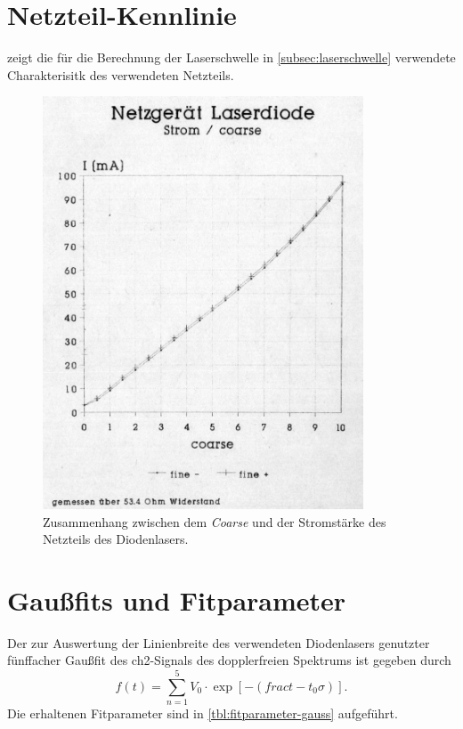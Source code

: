 \documentclass[../bericht.tex]{subfiles}
\begin{document}
  \begin{appendices}

    \section{Netzteil-Kennlinie}
    \label{sec:netzteil-kennlinie}
       zeigt die für die Berechnung der Laserschwelle in \cref{subsec:laserschwelle} verwendete Charakterisitk des verwendeten Netzteils.

      \begin{figure}[H]
        \centering
        \includegraphics[width=0.85\textwidth]{figures/Stromkennlinie_Laserdiode.pdf}
        \caption{Zusammenhang zwischen dem \textit{Coarse} und der Stromstärke des Netzteils des Diodenlasers.}
        \label{fig:netzteil-kennlinie}
      \end{figure}


    \section{Gau\ss{}fits und Fitparameter}
    \label{sec:gauss-fit-parameter}

      Der zur Auswertung der Linienbreite des verwendeten Diodenlasers genutzter fünffacher Gau\ss{}fit des ch2-Signals des dopplerfreien Spektrums ist gegeben durch
      \begin{equation*}
        f(t)=\sum_{n=1}^5 V_0 \cdot \exp \left[ -\left( frac{t-t_0}{\sigma} \right) \right].
      \end{equation*}
      Die erhaltenen Fitparameter sind in \cref{tbl:fitparameter-gauss} aufgeführt.


\end{appendices}
\end{document}
